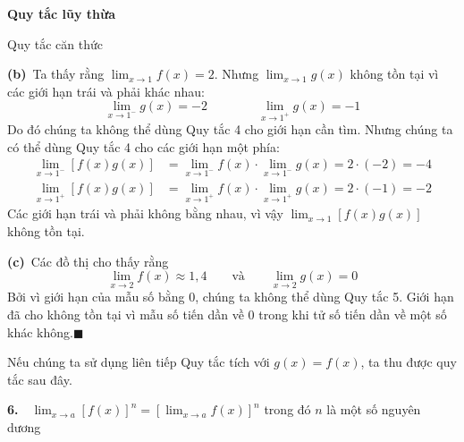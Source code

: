 \noindent
\begin{minipage}[t]{0.26\textwidth}
    \raggedleft\sffamily\bfseries\color{stewartgreen}
    \vspace*{270pt}
    Quy tắc lũy thừa\par
    \vspace{60pt}
    Quy tắc căn thức\par
\end{minipage}%
\hfill
\begin{minipage}[t]{0.71\textwidth}
    \textbf{(b)}\, Ta thấy rằng $\lim_{x \to 1} f(x) = 2$. Nhưng $\lim_{x \to 1} g(x)$ không tồn tại vì các giới hạn trái và phải khác nhau:
    \[
    \lim_{x \to 1^-} g(x) = -2 \qquad\qquad \lim_{x \to 1^+} g(x) = -1
    \]
    Do đó chúng ta không thể dùng Quy tắc 4 cho giới hạn cần tìm. Nhưng chúng ta có thể dùng Quy tắc 4 cho các giới hạn một phía:
    \begin{align*}
    \lim_{x \to 1^-} [f(x)g(x)] &= \lim_{x \to 1^-} f(x) \cdot \lim_{x \to 1^-} g(x) = 2 \cdot (-2) = -4\\[4pt]
    \lim_{x \to 1^+} [f(x)g(x)] &= \lim_{x \to 1^+} f(x) \cdot \lim_{x \to 1^+} g(x) = 2 \cdot (-1) = -2
    \end{align*}
    Các giới hạn trái và phải không bằng nhau, vì vậy $\lim_{x \to 1} [f(x)g(x)]$ không tồn tại.

    \textbf{(c)}\, Các đồ thị cho thấy rằng
    \[
    \lim_{x \to 2} f(x) \approx 1{,}4 \qquad\text{và}\qquad \lim_{x \to 2} g(x) = 0
    \]
    Bởi vì giới hạn của mẫu số bằng $0$, chúng ta không thể dùng Quy tắc 5. Giới hạn đã cho không tồn tại vì mẫu số tiến dần về $0$ trong khi tử số tiến dần về một số khác không.\hfill{\color{stewartcyan}\footnotesize$\blacksquare$}

    \vspace{3pt}
    Nếu chúng ta sử dụng liên tiếp Quy tắc tích với $g(x) = f(x)$, ta thu được quy tắc sau đây.

    \begin{tcolorbox}[
        sharp corners,
        colback=white,
        colframe=stewartred,
        boxrule=0.75pt,
        left=10pt, right=10pt, top=5pt, bottom=5pt,
        before skip=6pt, after skip=7pt
    ]
    \textbf{\color{stewartred}6.}\ \, $\displaystyle \lim_{x \to a} [f(x)]^n = \left[ \lim_{x \to a} f(x) \right]^n$ \qquad\quad trong đó $n$ là một số nguyên dương
    \end{tcolorbox}


\end{minipage}
